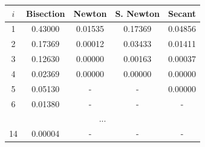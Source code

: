 \documentclass{article}
\begin{document}
		\begin{center} \begin{tabular}{|c|c|c|c|c|}
			\hline
			$i$ & Bisection & Newton & S. Newton & Secant\\
			\hline
			1 & 0.43000 & 0.01535 & 0.17369 & 0.04856\\ 
			\hline
			2 & 0.17369 & 0.00012 & 0.03433 & 0.01411\\
			\hline
			3 & 0.12630 & 0.00000 & 0.00163 & 0.00037\\
			\hline
			4 & 0.02369 & 0.00000 & 0.00000 & 0.00000\\
			\hline
			5 & 0.05130 & - & - & 0.00000\\
			\hline
			6 & 0.01380 & - & - & -\\
			\multicolumn{5}{c}{...}\\
			14 & 0.00004 & - & - & -\\
			\hline
		\end{tabular} \end{center}
\end{document}
